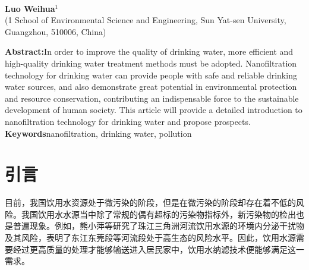 \documentclass[a4paper,onecolumn,twoside]{article}
\begin{document}
            \begin{center}
              \parbox{\textwidth}{
                \begin{center}
                  {}\\
                  \vspace{-0.0cm}
                \end{center}
                \begin{center}
                  \textbf{Luo Weihua$^1$}\\[2pt]
                  \small{(1 School of Environmental Science and Engineering, Sun Yat-sen University, Guangzhou, 510006, China)}\\[2pt]
                \end{center}
                {\small{\textbf{Abstract:}\quad In order to improve the quality of drinking water, more efficient and high-quality drinking water treatment methods must be adopted. Nanofiltration technology for drinking water can provide people with safe and reliable drinking water sources, and also demonstrate great potential in environmental protection and resource conservation, contributing an indispensable force to the sustainable development of human society. This article will provide a detailed introduction to nanofiltration technology for drinking water and propose prospects.
                \\
                \textbf{Keywords}\quad nanofiltration, drinking water, pollution}}
              }
            \end{center}


  \section{引言}
  目前，我国饮用水资源处于微污染的阶段，但是在微污染的阶段却存在着不低的风险\cite{LiuZhongGuoShuiYuanWeiWuRanXianZhuangJiFengXianFangKongJianYi2021}。我国饮用水水源当中除了常规的偶有超标的污染物指标外，新污染物的检出也是普遍现象。例如，熊小萍\cite{XiongZhuJiangSanJiaoZhouHeLiuYinYongShuiYuanZhongDeHuanJingNeiFenMiGanRaoWuJiQiFengXian2020}等研究了珠江三角洲河流饮用水源的环境内分泌干扰物及其风险，表明了东江东莞段等河流段处于高生态的风险水平。因此，饮用水源需要经过更高质量的处理才能够输送进入居民家中，饮用水纳滤技术便能够满足这一需求。
\end{document}
